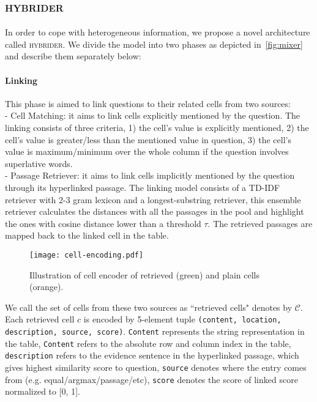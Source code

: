 \documentclass[11pt,a4paper]{article}
\newcommand{\model}{\textsc{hybrider}\xspace}
\begin{document}
\subsection{\model}
In order to cope with heterogeneous information, we propose a novel architecture called \model. We divide the model into two phases as depicted in~\autoref{fig:mixer} and describe them separately below:
\paragraph{Linking}
This phase is aimed to link questions to their related cells from two sources: \\
\noindent - Cell Matching: it aims to link cells explicitly mentioned by the question. The linking consists of three criteria, 1) the cell's value is explicitly mentioned, 2) the cell's value is greater/less than the mentioned value in question, 3) the cell's value is maximum/minimum over the whole column if the question involves superlative words.\\
\noindent - Passage Retriever: it aims to link cells implicitly mentioned by the question through its hyperlinked passage. The linking model consists of a TD-IDF retriever with 2-3 gram lexicon and a longest-substring retriever, this ensemble retriever calculates the distances with all the passages in the pool and highlight the ones with cosine distance lower than a threshold $\tau$. The retrieved passages are mapped back to the linked cell in the table.
\begin{figure}[!ht]
    \centering
    \texttt{[image: cell-encoding.pdf]}
    \caption{Illustration of cell encoder of retrieved (green) and plain cells (orange).}
    \label{fig:cell}
    \vspace{-2ex}
\end{figure}

We call the set of cells from these two sources as ``retrieved cells" denotes by $\mathcal{C}$. Each retrieved cell $c$ is encoded by 5-element tuple \texttt{(content, location, description, source, score)}. \texttt{Content} represents the string representation in the table, \texttt{Content} refers to the absolute row and column index in the table, \texttt{description} refers to the evidence sentence in the hyperlinked passage, which gives highest similarity score to question, \texttt{source} denotes where the entry comes from (e.g. equal/argmax/passage/etc), \texttt{score} denotes the score of linked score normalized to [0, 1].
\end{document}
